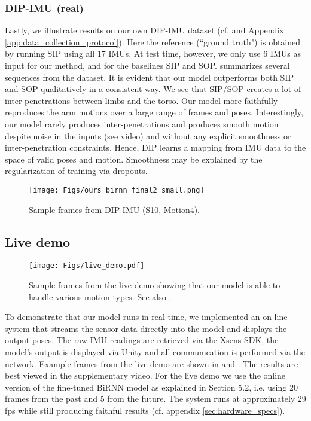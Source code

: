 \documentclass[acmtog]{acmart}
\begin{document}
\subsubsection{DIP-IMU (real)}
Lastly, we illustrate results on our own DIP-IMU dataset (cf.  and Appendix \ref{app:data_collection_protocol}). 
Here the reference (``ground truth") is obtained by running SIP using all 17 IMUs. At test time, however, we only use 6 IMUs as input for our method, and for the baselines SIP and SOP.  summarizes several sequences from the dataset. It is evident that our model outperforms both SIP and SOP qualitatively in a consistent way. We see that SIP/SOP creates a lot of inter-penetrations between limbs and the torso. Our model more faithfully reproduces the arm motions over a large range of frames and poses. Interestingly, our model rarely produces inter-penetrations and produces smooth motion despite noise in the inputs (see video) and without any explicit smoothness or inter-penetration constraints. Hence, DIP learns a mapping from IMU data to the space of valid poses and motion. Smoothness may be explained by the regularization of training via dropouts. 

\begin{figure}
\centering
\texttt{[image: Figs/ours\_birnn\_final2\_small.png]}
\caption{Sample frames from DIP-IMU (S10, Motion4).}
\label{fig:tc_birnn_ours}
\end{figure}\subsection{Live demo}\begin{figure*}
\texttt{[image: Figs/live\_demo.pdf]}
\centering
\caption{Sample frames from the live demo showing that our model is able to handle various motion types. See also .}
\label{fig:live_demo}
\end{figure*}\label{sec:live_demo}

To demonstrate that our model runs in real-time, we  implemented an on-line system that streams the sensor data directly into the model and displays the output poses. The raw IMU readings are retrieved via the Xsens SDK, the model's output is displayed via Unity and all communication is performed via the network. Example frames from the live demo are shown in  and . The results are best viewed in the supplementary video. For the live demo we use the online version of the fine-tuned BiRNN model as explained in Section 5.2, i.e. using 20 frames from the past and 5 from the future. The system runs at approximately 29 fps while still producing faithful results (cf. appendix \ref{sec:hardware_specs}).
\end{document}

